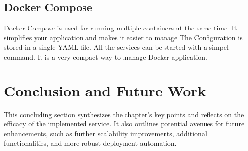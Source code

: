 \subsection{Docker Compose}
Docker Compose is used for running multiple containers at the same time. It simplifies your application and makes it easier to manage 
The Configuration is stored in a single YAML file. All the services can be started with a simpel command. It is a very compact way to manage Docker application.
\cite{docker_compose} 


\section{Conclusion and Future Work}
This concluding section synthesizes the chapter’s key points and reflects on the efficacy of the implemented service. It also outlines potential avenues for future enhancements, such as further scalability improvements, additional functionalities, and more robust deployment automation.





